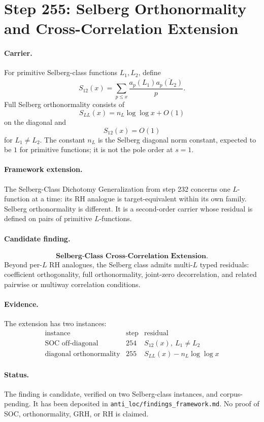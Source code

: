 \section*{Step 255: Selberg Orthonormality and Cross-Correlation Extension}

\paragraph{Carrier.}
For primitive Selberg-class functions \(L_1,L_2\), define
\[
S_{12}(x)=\sum_{p\le x}
\frac{a_p(L_1)\overline{a_p(L_2)}}{p}.
\]
Full Selberg orthonormality consists of
\[
S_{LL}(x)=n_L\log\log x+O(1)
\]
on the diagonal and
\[
S_{12}(x)=O(1)
\]
for \(L_1\ne L_2\).  The constant \(n_L\) is the Selberg diagonal norm
constant, expected to be \(1\) for primitive functions; it is not the pole
order at \(s=1\).

\paragraph{Framework extension.}
The Selberg-Class Dichotomy Generalization from step 232 concerns one
\(L\)-function at a time: its RH analogue is target-equivalent within its own
family.  Selberg orthonormality is different.  It is a second-order carrier
whose residual is defined on pairs of primitive \(L\)-functions.

\paragraph{Candidate finding.}
\[
\textbf{Selberg-Class Cross-Correlation Extension.}
\]
Beyond per-\(L\) RH analogues, the Selberg class admits multi-\(L\) typed
residuals: coefficient orthogonality, full orthonormality, joint-zero
decorrelation, and related pairwise or multiway correlation conditions.

\paragraph{Evidence.}
The extension has two instances:
\[
\begin{array}{c|c|c}
\text{instance} & \text{step} & \text{residual}\\
\hline
\text{SOC off-diagonal} & 254 & S_{12}(x),\ L_1\ne L_2\\
\text{diagonal orthonormality} & 255 & S_{LL}(x)-n_L\log\log x
\end{array}
\]

\paragraph{Status.}
The finding is candidate, verified on two Selberg-class instances, and
corpus-pending.  It has been deposited in \texttt{anti_loc/findings_framework.md}.
No proof of SOC, orthonormality, GRH, or RH is claimed.

